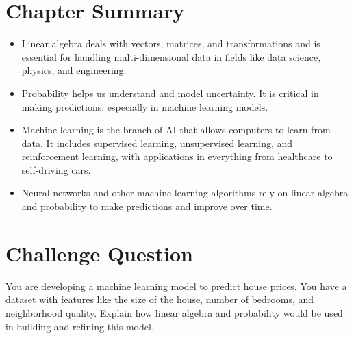\section{Chapter Summary}
\begin{itemize}
    \item Linear algebra deals with vectors, matrices, and transformations and is essential for handling multi-dimensional data in fields like data science, physics, and engineering.
    \item Probability helps us understand and model uncertainty. It is critical in making predictions, especially in machine learning models.
    \item Machine learning is the branch of AI that allows computers to learn from data. It includes supervised learning, unsupervised learning, and reinforcement learning, with applications in everything from healthcare to self-driving cars.
    \item Neural networks and other machine learning algorithms rely on linear algebra and probability to make predictions and improve over time.
\end{itemize}

\section*{Challenge Question}
You are developing a machine learning model to predict house prices. You have a dataset with features like the size of the house, number of bedrooms, and neighborhood quality. Explain how linear algebra and probability would be used in building and refining this model.

